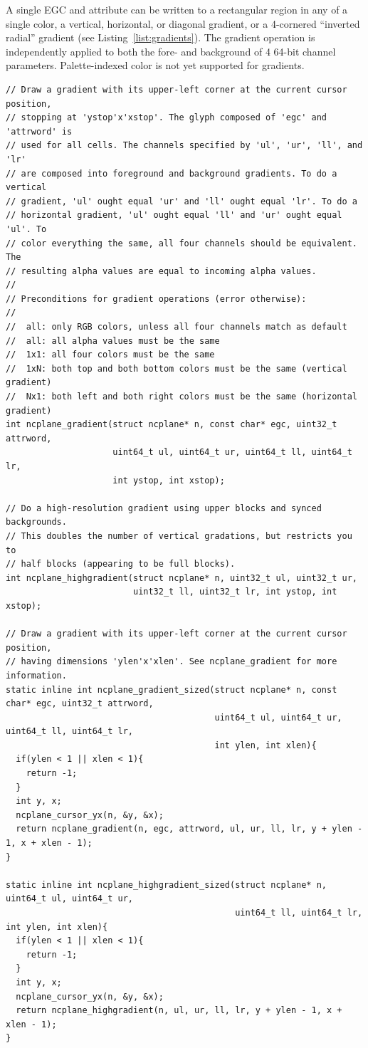 \documentclass[letterpaper,10pt]{article}
\begin{document}
A single EGC and attribute can be written to a rectangular region in any of
a single color, a vertical, horizontal, or diagonal gradient, or a 4-cornered
``inverted radial'' gradient (see Listing~\ref{list:gradients}). The gradient
operation is independently applied to both the fore- and background of 4 64-bit
channel parameters. Palette-indexed color is not yet supported for gradients.

\begin{listing}[!htb]
\begin{verbatim}
// Draw a gradient with its upper-left corner at the current cursor position,
// stopping at 'ystop'x'xstop'. The glyph composed of 'egc' and 'attrword' is
// used for all cells. The channels specified by 'ul', 'ur', 'll', and 'lr'
// are composed into foreground and background gradients. To do a vertical
// gradient, 'ul' ought equal 'ur' and 'll' ought equal 'lr'. To do a
// horizontal gradient, 'ul' ought equal 'll' and 'ur' ought equal 'ul'. To
// color everything the same, all four channels should be equivalent. The
// resulting alpha values are equal to incoming alpha values.
//
// Preconditions for gradient operations (error otherwise):
//
//  all: only RGB colors, unless all four channels match as default
//  all: all alpha values must be the same
//  1x1: all four colors must be the same
//  1xN: both top and both bottom colors must be the same (vertical gradient)
//  Nx1: both left and both right colors must be the same (horizontal gradient)
int ncplane_gradient(struct ncplane* n, const char* egc, uint32_t attrword,
                     uint64_t ul, uint64_t ur, uint64_t ll, uint64_t lr,
                     int ystop, int xstop);

// Do a high-resolution gradient using upper blocks and synced backgrounds.
// This doubles the number of vertical gradations, but restricts you to
// half blocks (appearing to be full blocks).
int ncplane_highgradient(struct ncplane* n, uint32_t ul, uint32_t ur,
                         uint32_t ll, uint32_t lr, int ystop, int xstop);

// Draw a gradient with its upper-left corner at the current cursor position,
// having dimensions 'ylen'x'xlen'. See ncplane_gradient for more information.
static inline int ncplane_gradient_sized(struct ncplane* n, const char* egc, uint32_t attrword,
                                         uint64_t ul, uint64_t ur, uint64_t ll, uint64_t lr,
                                         int ylen, int xlen){
  if(ylen < 1 || xlen < 1){
    return -1;
  }
  int y, x;
  ncplane_cursor_yx(n, &y, &x);
  return ncplane_gradient(n, egc, attrword, ul, ur, ll, lr, y + ylen - 1, x + xlen - 1);
}

static inline int ncplane_highgradient_sized(struct ncplane* n, uint64_t ul, uint64_t ur,
                                             uint64_t ll, uint64_t lr, int ylen, int xlen){
  if(ylen < 1 || xlen < 1){
    return -1;
  }
  int y, x;
  ncplane_cursor_yx(n, &y, &x);
  return ncplane_highgradient(n, ul, ur, ll, lr, y + ylen - 1, x + xlen - 1);
}
\end{verbatim}
\caption{Drawing gradients.}
\label{list:gradients}
\end{listing}
\end{document}
